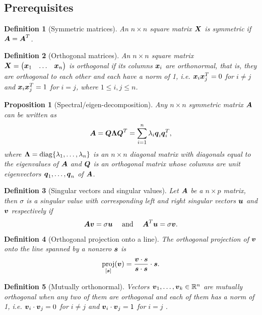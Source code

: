 \documentclass[12pt]{article}
\newtheorem{prop}{Proposition}[section]
\newtheorem{dfn}{Definition}[section]
\DeclareMathOperator{\proj}{proj}
\DeclareMathOperator{\diag}{diag}
\begin{document}
	\subsection{Prerequisites}
	\begin{dfn}[Symmetric matrices]
		An $n\times n$ square matrix $\boldsymbol{X}$ is symmetric if $\boldsymbol{A}=\boldsymbol{A}^T$.
	\end{dfn}
	\vspace{1mm}
	\begin{dfn}[Orthogonal matrices]
		An $n\times n$ square matrix $\boldsymbol{X}=\begin{pmatrix}
			\boldsymbol{x}_1 & \ldots & \boldsymbol{x}_n
		\end{pmatrix}$ is orthogonal if its columns $\boldsymbol{x}_i$ are orthonormal, that is, they are orthogonal to each other and each have a norm of 1, i.e. $\boldsymbol{x}_i\boldsymbol{x}_j^T=0$ for $i\neq j$ and $\boldsymbol{x}_i\boldsymbol{x}_j^T=1$ for $i=j$, where $1\leq i,j\leq n$.
	\end{dfn}
	\vspace{1mm}
	\begin{prop}[Spectral/eigen-decomposition]
		Any $n\times n$ symmetric matrix $\boldsymbol{A}$ can be written as 
		$$\boldsymbol{A}=\boldsymbol{Q}\boldsymbol{\Lambda}\boldsymbol{Q}^T=\sum_{i=1}^{n}\lambda_i\boldsymbol{q}_i\boldsymbol{q}_i^T,$$
		where $\boldsymbol{\Lambda}=\diag\{\lm_1,\ldots,\lm_n\}$ is an $n\times n$ diagonal matrix with diagonals equal to the eigenvalues of $\boldsymbol{A}$ and $\boldsymbol{Q}$ is an orthogonal matrix whose columns are unit eigenvectors $\boldsymbol{q}_1,\ldots,\boldsymbol{q}_n$ of $\boldsymbol{A}$.
	\end{prop}
	\vspace{1mm}
	\begin{dfn}[Singular vectors and singular values]
		Let $\boldsymbol{A}$ be a $n\times p$ matrix, then $\sigma$ is a singular value with corresponding left and right singular vectors $\boldsymbol{u}$ and $\boldsymbol{v}$ respectively if
		$$\boldsymbol{A}\boldsymbol{v}=\sigma\boldsymbol{u} \quad \text{ and }\quad \boldsymbol{A}^T\boldsymbol{u}=\sigma\boldsymbol{v}.$$
	\end{dfn}
	\vspace{1mm}
	\begin{dfn}[Orthogonal projection onto a line]
		The orthogonal projection of $\boldsymbol{v}$ onto the line spanned by a nonzero $\boldsymbol{s}$ is 
		$$\proj_{[\bms]}(\bmv)=\frac{\bmv\cdot\bms}{\bms\cdot\bms}\cdot\bms.$$
	\end{dfn}
	\vspace{1mm}
	\begin{dfn}[Mutually orthonormal]
		Vectors $\bmv_1,\ldots,\bmv_k\in\Rn$ are mutually orthogonal when any two of them are orthogonal and each of them has a norm of 1, i.e. $\boldsymbol{v}_i\cdot\boldsymbol{v}_j=0$ for $i\neq j$ and $\boldsymbol{v}_i\cdot\boldsymbol{v}_j=1$ for $i= j$ .
	\end{dfn}
	\pagebreak
\end{document}
